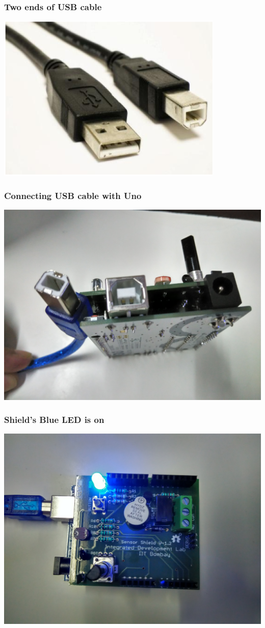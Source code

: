 \documentclass[17pt,xcolor=table]{beamer}
\begin{document}
\begin{frame}
\frametitle{Two ends of USB cable}
\centerline{
\includegraphics[width=0.9\linewidth]{figures/cable.png}
}
\end{frame}

\begin{frame}
\frametitle{Connecting USB cable with Uno}
\centerline{
\includegraphics[width=0.9\linewidth]{figures/USB.jpg}
}
\end{frame}

\begin{frame}
\frametitle{Shield's Blue LED is on}
\centerline{
\includegraphics[width=0.9\linewidth]{figures/LED.jpg}
}
\end{frame}
\end{document}
